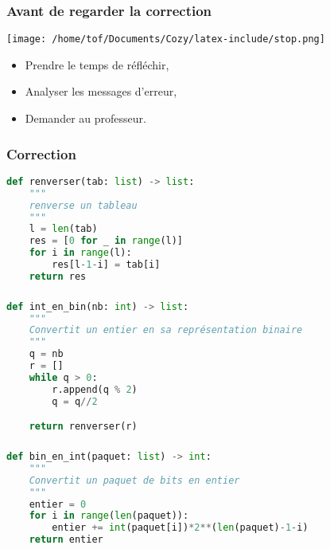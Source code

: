 \documentclass[svgnames,11pt]{beamer}
\begin{document}
\begin{frame}
    \frametitle{Avant de regarder la correction}
\begin{center}
    \centering
    \texttt{[image: /home/tof/Documents/Cozy/latex-include/stop.png]}
    \end{center}
{\Large
    \begin{itemize}
        \item Prendre le temps de réfléchir,
        \item Analyser les messages d'erreur,
        \item Demander au professeur.
    \end{itemize}
}
\end{frame}
\begin{frame}[fragile]
    \frametitle{Correction}

\begin{center}
\begin{lstlisting}[language=Python , basicstyle=\ttfamily\small, xleftmargin=0.2em, xrightmargin=0em]
def renverser(tab: list) -> list:
    """
    renverse un tableau
    """
    l = len(tab)
    res = [0 for _ in range(l)]
    for i in range(l):
        res[l-1-i] = tab[i]
    return res
\end{lstlisting}
\end{center}

\end{frame}
\begin{frame}[fragile]
    \frametitle{}


\begin{center}
\begin{lstlisting}[language=Python , basicstyle=\ttfamily\small, xleftmargin=0.2em, xrightmargin=0em]
def int_en_bin(nb: int) -> list:
    """
    Convertit un entier en sa représentation binaire
    """
    q = nb
    r = []
    while q > 0:
        r.append(q % 2)
        q = q//2

    return renverser(r)
\end{lstlisting}
\end{center}

\end{frame}

\begin{frame}[fragile]
    \frametitle{}


\begin{center}
\begin{lstlisting}[language=Python , basicstyle=\ttfamily\small, xleftmargin=0.2em, xrightmargin=-0.5em]
def bin_en_int(paquet: list) -> int:
    """
    Convertit un paquet de bits en entier
    """
    entier = 0
    for i in range(len(paquet)):
        entier += int(paquet[i])*2**(len(paquet)-1-i)
    return entier
\end{lstlisting}
\end{center}

\end{frame}
\end{document}

